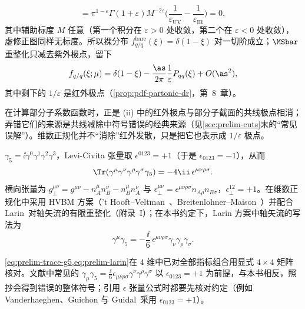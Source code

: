 \begin{example}
\begin{equation}
=\pi^{1-\varepsilon}\Gamma(1+\varepsilon)M^{-2\varepsilon}\Big(\frac1{\varepsilon_{\mathrm{UV}}}-\frac1{\varepsilon_{\mathrm{IR}}}\Big)=0, %
\end{equation}
其中辅助标度 $M$ 任意（第一个积分在 $\varepsilon>0$ 处收敛，第二个在 $\varepsilon<0$ 处收敛），虚修正图同样无标度。所以裸分布 $f^{\mathrm{bare}}_{q/q}(\xi)=\delta(1-\xi)$ 对一切阶成立；$\MSbar$ 重整化只减去紫外极点，留下
\[
f_{q/q}(\xi;\mu)=\delta(1-\xi)-\frac{\as}{2\pi}\frac1\varepsilon P_{qq}(\xi)+O(\as^2),
\]
其中剩下的 $1/\varepsilon$ 是红外极点（\cref{prop:pdf-partonic-dr}，第~8~章）。
\end{example}

在计算部分子系数函数时，正是 (ii) 中的红外极点与部分子截面的共线极点相消；弄错它们的来源是共线减除中符号错误的经典来源（见\cref{sec:prelim-cuts}末的“常见误解”）。维数正规化并不“消除”红外发散，只是把它也表示成 $1/\varepsilon$ 极点。

\begin{definition}\label{def:prelim-gamma5}
$\gamma_5=\ii\gamma^0\gamma^1\gamma^2\gamma^3$，Levi-Civita 张量取 $\epsilon^{0123}=+1$（于是 $\epsilon_{0123}=-1$），从而
\begin{equation}\label{eq:prelim-trace-g5}
\Tr(\gamma^\mu\gamma^\nu\gamma^\rho\gamma^\sigma\gamma_5)=-4\ii\,\epsilon^{\mu\nu\rho\sigma}. %
\end{equation}
横向张量为 $g_\perp^{\mu\nu}=g^{\mu\nu}-n_A^\mu n_B^\nu-n_B^\mu n_A^\nu$ 与 $\epsilon_\perp^{\mu\nu}=\epsilon^{\mu\nu\rho\sigma}n_{A\rho}n_{B\sigma}$，$\epsilon_\perp^{12}=+1$。在维数正规化中采用 HVBM 方案（'t Hooft--Veltman~\cite{tHooftVeltman1972}、Breitenlohner--Maison~\cite{BreitenlohnerMaison1977a}）并配合 Larin~\cite{Larin:1993tq}对轴矢流的有限重整化（附录~I）；在本书约定下，Larin 方案中轴矢流的写法为
\begin{equation}\label{eq:prelim-larin}
\gamma^\mu\gamma_5=-\frac{\ii}{6}\,\epsilon^{\mu\nu\rho\sigma}\gamma_\nu\gamma_\rho\gamma_\sigma . %
\end{equation}
\end{definition}

\cref{eq:prelim-trace-g5,eq:prelim-larin}在 $4$ 维中已对全部指标组合用显式 $4\times4$ 矩阵核对。文献中常见的 $\gamma_\mu\gamma_5=\frac{\ii}{6}\epsilon_{\mu\nu\rho\sigma}\gamma^\nu\gamma^\rho\gamma^\sigma$ 以 $\epsilon_{0123}=+1$ 为前提，与本书相反，照抄会得到错误的整体符号；引用 $\epsilon$ 张量公式时都要先核对约定（例如 Vanderhaeghen、Guichon 与 Guidal~\cite{Vanderhaeghen:1999xj}采用 $\epsilon_{0123}=+1$）。
